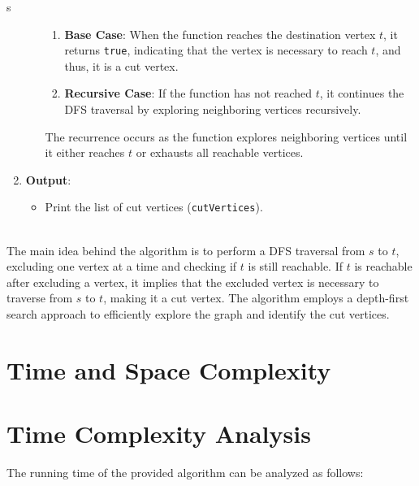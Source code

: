 s\documentclass{article}
\begin{document}
\begin{enumerate}
\begin{itemize}
        \begin{enumerate}
            \item \textbf{Base Case}: When the function reaches the destination vertex \( t \), it returns \texttt{true}, indicating that the vertex is necessary to reach \( t \), and thus, it is a cut vertex.
            
            \item \textbf{Recursive Case}: If the function has not reached \( t \), it continues the DFS traversal by exploring neighboring vertices recursively.
\end{enumerate}

The recurrence occurs as the function explores neighboring vertices until it either reaches \( t \) or exhausts all reachable vertices.
    \end{itemize}
    
    \item \textbf{Output}:
    \begin{itemize}
        \item Print the list of cut vertices (\texttt{cutVertices}).
    \end{itemize}
\end{enumerate}
\\
The main idea behind the algorithm is to perform a DFS traversal from $s$ to $t$, excluding one vertex at a time and checking if $t$ is still reachable. If $t$ is reachable after excluding a vertex, it implies that the excluded vertex is necessary to traverse from $s$ to $t$, making it a cut vertex. The algorithm employs a depth-first search approach to efficiently explore the graph and identify the cut vertices.


\section*{\huge{Time and Space Complexity}}
\section*{Time Complexity Analysis}


The running time of the provided algorithm can be analyzed as follows:
\end{document}
